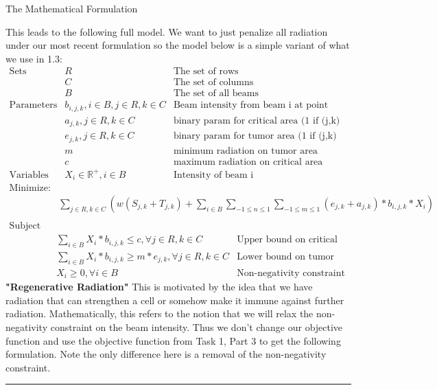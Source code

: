 \documentclass[12pt]{article}
\makeatletter
\newenvironment{task}{\@startsection
       {section}{1}
       {0.4em}{-.5ex plus -1ex minus -.2ex}{.5ex plus .2ex}
       {\pagebreak[3]\large\bf\noindent{Task}}}
       {\nopagebreak[3]\vspace{3ex}\begin{center}\rule{1\linewidth}{.3pt}\end{center}}
\makeatother
\begin{document}
\begin{task}{The Mathematical Formulation}
\begin{enumerate}
This leads to the following full model. We want to just penalize all radiation under our most recent formulation so the model below is a simple variant of what we use in 1.3:
\begin{eqnarray*}  
 \textrm{Sets} &  R & \textrm{The set of rows} \\
			& C & \textrm{The set of columns}\\ 
			& B & \textrm{The set of all beams} \\
 \textrm{Parameters} & b_{i,j,k}, i \in B, j \in R, k \in C   & \textrm{Beam intensity from beam i at point (j,k)} \\
& a_{j,k}, j \in R, k \in C   & \textrm{binary param for critical area (1 if (j,k) in critical area)} \\ 
& e_{j,k}, j \in R, k \in C   & \textrm{binary param for tumor area (1 if (j,k) in tumor area)} \\ 
& m & \textrm{minimum radiation on tumor area} \\
& c & \textrm{maximum radiation on critical area} \\
\textrm{Variables} 
& X_{i} \in \mathbb{R}^+, i \in B & \textrm{Intensity of beam i} 
\end{eqnarray*}
\begin{eqnarray*} 
\textrm{Minimize:} \\
& \sum_{j \in R, k \in C} (w(S_{j,k} + T_{j,k}) + \sum_{i \in B} \sum_{-1 \leq n \leq 1} \sum_{-1 \leq m \leq 1} (e_{j,k}+a_{j,k})  * b_{i,j,k} * X_{i})\\ 
\end{eqnarray*}
\begin{eqnarray*} 
\textrm{Subject to:}\\
& \sum_{i \in B}  X_{i} * b_{i,j,k} \leq c, \forall j \in R, k \in C & \textrm {Upper bound on critical area radiation} \\
& \sum_{i \in B} X_{i} * b_{i,j,k} \geq m * e_{j,k}, \forall j \in R, k \in C & \textrm {Lower bound on tumor radiation} \\
& X_{i} \geq 0, \forall i \in B & \textrm{Non-negativity constraint} 
\end{eqnarray*}
\textbf{"Regenerative Radiation"} This is motivated by the idea that we have radiation that can strengthen a cell or somehow make it immune against further radiation. Mathematically, this refers to the notion that we will relax the non-negativity constraint on the beam intensity. Thus we don't change our objective function and use the objective function from Task 1, Part 3 to get the following formulation. Note the only difference here is a removal of the non-negativity constraint. 

\end{enumerate}
\end{task}
\end{document}
